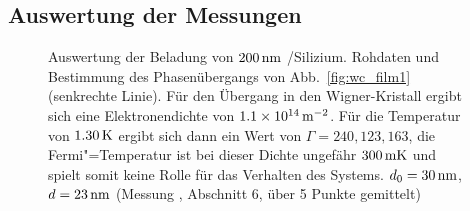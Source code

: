 \subsection{Auswertung der Messungen}
\label{ssec:wigner_auswertung}
\begin{figure}[h!tbp]
    \hfill%
    \begin{minipage}[b]{\textwidth-\midwidth-\tabcolsep}
        \caption[Auswertung Wigner-Übergang auf \SiO]{Auswertung der Beladung von $\unit[200]{nm}$ \SiO/Silizium. Rohdaten und Bestimmung des Phasenübergangs von Abb.~\ref{fig:wc_film1} (senkrechte Linie). Für den Übergang in den Wigner-Kristall ergibt sich eine Elektronendichte von $\unit[1.1\times10^{14}]{\Em}$. Für die Temperatur von $\unit[1.30]{K}$ ergibt sich dann ein Wert von $\Gamma=240, 123, 163$, die Fermi"=Temperatur ist bei dieser Dichte ungefähr $\unit[300]{mK}$ und spielt somit keine Rolle für das Verhalten des Systems. $d_0=\unit[30]{nm}$, $d=\unit[23]{nm}$ (Messung , Abschnitt 6, über 5 Punkte gemittelt)}
        \label{fig:wcres_film1}
    \end{minipage}
\end{figure}

